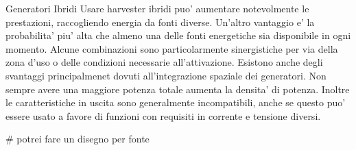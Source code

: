 \begin{section}{Generatori Ibridi}
    Usare harvester ibridi puo' aumentare notevolmente le prestazioni, raccogliendo energia da fonti diverse. Un'altro vantaggio e' la probabilita' piu' alta che almeno una delle fonti energetiche sia disponibile in ogni momento. Alcune combinazioni sono particolarmente sinergistiche per via della zona d'uso o delle condizioni necessarie all'attivazione. Esistono anche degli svantaggi principalmenet dovuti all'integrazione spaziale dei generatori. Non sempre avere una maggiore potenza totale aumenta la densita' di potenza. Inoltre le caratteristiche in uscita sono generalmente incompatibili, anche se questo puo' essere usato a favore di funzioni con requisiti in corrente e tensione diversi\cite{shaukatApplicationsSustainableHybrid2023}.
\end{section}

\# potrei fare un disegno per fonte
